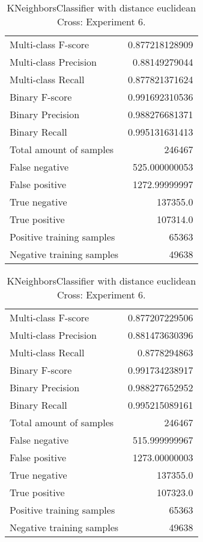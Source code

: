 \begin{table}[H]
\begin{minipage}{0.5\textwidth}
\caption{KNeighborsClassifier with distance euclidean Cross: Experiment 5.}
\centering
\begin{tabular}{l r}
\toprule
Multi-class F-score & 0.877218128909 \\
Multi-class Precision & 0.88149279044 \\
Multi-class Recall & 0.877821371624 \\
\midrule
Binary F-score & 0.991692310536 \\
Binary Precision & 0.988276681371 \\
Binary Recall & 0.995131631413 \\
\midrule
Total amount of samples & 246467 \\
False negative & 525.000000053 \\
False positive & 1272.99999997 \\
True negative & 137355.0 \\
True positive & 107314.0 \\
\midrule
Positive training samples & 65363 \\
Negative training samples & 49638 \\
\bottomrule
\end{tabular}
\end{minipage}
\hfillx
\begin{minipage}{0.5\textwidth}
\caption{KNeighborsClassifier with distance euclidean Cross: Experiment 6.}
\centering
\begin{tabular}{l r}
\toprule
Multi-class F-score & 0.877207229506 \\
Multi-class Precision & 0.881473630396 \\
Multi-class Recall & 0.8778294863 \\
\midrule
Binary F-score & 0.991734238917 \\
Binary Precision & 0.988277652952 \\
Binary Recall & 0.995215089161 \\
\midrule
Total amount of samples & 246467 \\
False negative & 515.999999967 \\
False positive & 1273.00000003 \\
True negative & 137355.0 \\
True positive & 107323.0 \\
\midrule
Positive training samples & 65363 \\
Negative training samples & 49638 \\
\bottomrule
\end{tabular}
\end{minipage}
\end{table}
